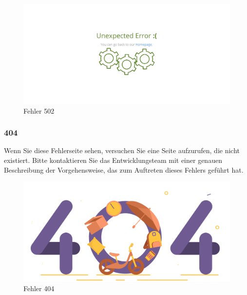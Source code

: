 \documentclass[enabledeprecatedfontcommands,fontsize=12pt,paper=a4,twoside]{scrartcl}
\begin{document}
\begin{figure}[h!]
\begin{center}
 \includegraphics[width=\textwidth]{screenshots/allgemein/500.png}
  \caption{Fehler 502}
  \label{fig:boat1}
\end{center}
\end{figure}

\subsubsection{404}
Wenn Sie diese Fehlerseite sehen, versuchen Sie eine Seite aufzurufen, die nicht existiert. Bitte kontaktieren Sie das Entwicklungsteam mit einer genauen Beschreibung der Vorgehensweise, das zum Auftreten dieses Fehlers geführt hat. \\

\begin{figure}[h!]
\begin{center}
 \includegraphics[width=\textwidth]{screenshots/allgemein/404.png}
  \caption{Fehler 404}
  \label{fig:boat1}
\end{center}
\end{figure}
\end{document}

